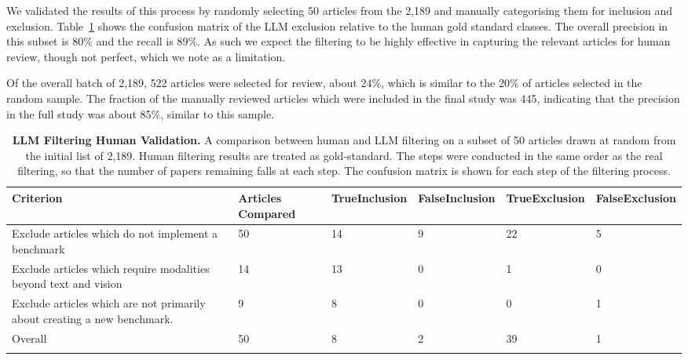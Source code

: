 We validated the results of this process by randomly selecting 50 articles from the 2,189 and manually categorising them for inclusion and exclusion. Table~\ref{tab:exclusion_validation} shows the confusion matrix of the LLM exclusion relative to the human gold standard classes. The overall precision in this subset is 80\% and the recall is 89\%. As such we expect the filtering to be highly effective in capturing the relevant articles for human review, though not perfect, which we note as a limitation. 

Of the overall batch of 2,189, 522 articles were selected for review, about 24\%, which is similar to the 20\% of articles selected in the random sample. The fraction of the manually reviewed articles which were included in the final study was 445, indicating that the precision in the full study was about 85\%, similar to this sample. 

\begin{table}[h!]
    \centering
    \renewcommand{\arraystretch}{1.3}
{\small
    \begin{tabular}
    {p{}p{}p{}p{}p{}p{}}
    \toprule
        \textbf{\newline Criterion} & \textbf{Articles \newline Compared} & \textbf{True\newline Inclusion} & \textbf{False\newline Inclusion} & \textbf{True\newline Exclusion} & \textbf{False\newline Exclusion}\\
        \midrule
        Exclude articles which do not implement a benchmark & 50 & 14 & 9 & 22 & 5\\
        Exclude articles which require modalities beyond text and vision & 14 & 13 & 0 & 1 & 0\\
        Exclude articles which are not primarily about creating a new benchmark. & 9 & 8 & 0 & 0 & 1\\
        Overall & 50 & 8 & 2 & 39 & 1 \\ 
        \bottomrule
        \\
    \end{tabular}
    \caption{\textbf{LLM Filtering Human Validation.} A comparison between human and LLM filtering on a subset of 50 articles drawn at random from the initial list of 2,189. Human filtering results are treated as gold-standard. The steps were conducted in the same order as the real filtering, so that the number of papers remaining falls at each step. The confusion matrix is shown for each step of the filtering process.}
    \label{tab:exclusion_validation}
    }
\end{table}



